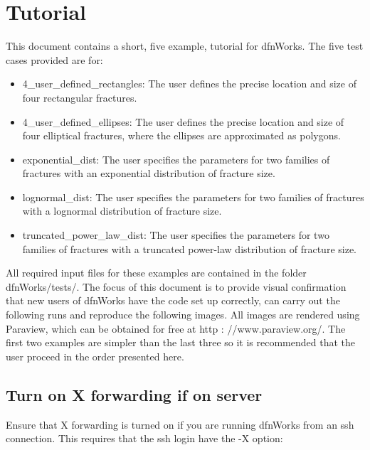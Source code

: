 \documentclass[letterpaper,10pt,english]{sphinxmanual}
\begin{document}
\chapter{Tutorial}
\label{\detokenize{tutorial::doc}}\label{\detokenize{tutorial:tutorial}}
This document contains a short, five example, tutorial for dfnWorks. The five test cases provided are for:
\begin{itemize}
\item {} 
4\_user\_defined\_rectangles: The user defines the precise location and size of four rectangular fractures.

\item {} 
4\_user\_defined\_ellipses: The user defines the precise location and size of four elliptical fractures, where the ellipses are approximated as polygons.

\item {} 
exponential\_dist: The user specifies the parameters for two families of fractures with an exponential distribution of fracture size.

\item {} 
lognormal\_dist: The user specifies the parameters for two families of fractures with a lognormal distribution of fracture size.

\item {} 
truncated\_power\_law\_dist: The user specifies the parameters for two families of fractures with a truncated power-law distribution of fracture size.

\end{itemize}

All required input files for these examples are contained in the folder dfnWorks/tests/. The focus of this document is to provide visual confirmation that new users of dfnWorks have the code set up correctly, can carry out the following runs and reproduce the following images. All images are rendered using Paraview, which can be obtained for free at http : //www.paraview.org/. The first two examples are simpler than the last three so it is recommended that the user proceed in the order presented here.


\section{Turn on X forwarding if on server}
\label{\detokenize{tutorial:turn-on-x-forwarding-if-on-server}}
Ensure that X forwarding is turned on if you are running dfnWorks from an ssh connection. This requires that the ssh login have the -X option:
\end{document}
